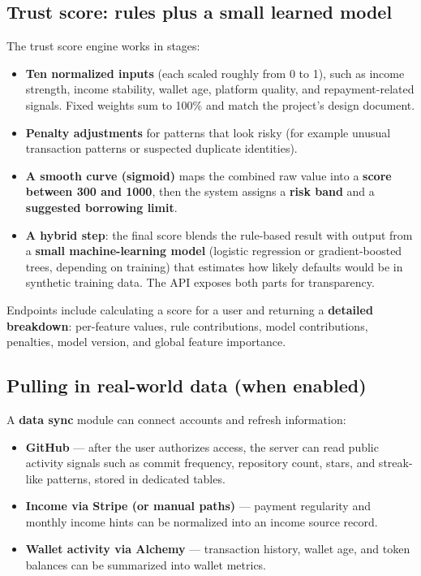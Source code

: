 \documentclass[11pt,a4paper]{article}
\begin{document}
\subsection{Trust score: rules plus a small learned model}
The trust score engine works in stages:

\begin{itemize}[leftmargin=*]
  \item \textbf{Ten normalized inputs} (each scaled roughly from 0 to 1), such as income strength, income stability, wallet age, platform quality, and repayment-related signals. Fixed weights sum to 100\% and match the project's design document.
  \item \textbf{Penalty adjustments} for patterns that look risky (for example unusual transaction patterns or suspected duplicate identities).
  \item \textbf{A smooth curve (sigmoid)} maps the combined raw value into a \textbf{score between 300 and 1000}, then the system assigns a \textbf{risk band} and a \textbf{suggested borrowing limit}.
  \item \textbf{A hybrid step}: the final score blends the rule-based result with output from a \textbf{small machine-learning model} (logistic regression or gradient-boosted trees, depending on training) that estimates how likely defaults would be in synthetic training data. The API exposes both parts for transparency.
\end{itemize}

Endpoints include calculating a score for a user and returning a \textbf{detailed breakdown}: per-feature values, rule contributions, model contributions, penalties, model version, and global feature importance.

\subsection{Pulling in real-world data (when enabled)}
A \textbf{data sync} module can connect accounts and refresh information:

\begin{itemize}[leftmargin=*]
  \item \textbf{GitHub} --- after the user authorizes access, the server can read public activity signals such as commit frequency, repository count, stars, and streak-like patterns, stored in dedicated tables.
  \item \textbf{Income via Stripe (or manual paths)} --- payment regularity and monthly income hints can be normalized into an income source record.
  \item \textbf{Wallet activity via Alchemy} --- transaction history, wallet age, and token balances can be summarized into wallet metrics.
\end{itemize}
\end{document}
